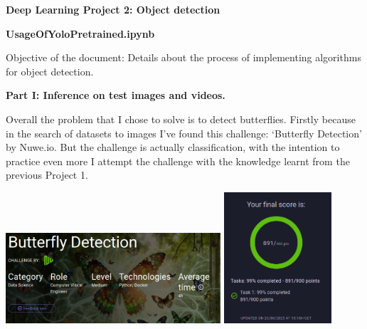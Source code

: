 \documentclass{cpsc202}
\begin{document}
    \centerline{\Large\textbf{Deep Learning Project 2: Object detection}}
    \Large\textbf{UsageOfYoloPretrained.ipynb}

    Objective of the document: Details about the process of implementing algorithms for object detection.

    \large\textbf{Part I: Inference on test images and videos.}

    Overall the problem that I chose to solve is to detect butterflies.
    Firstly because in the search of datasets to images I've found this challenge: `Butterfly Detection' by Nuwe.io.
    But the challenge is actually classification, with the intention to practice even more I attempt the challenge with the knowledge learnt from the previous Project 1.
    \begin{center}
        \includegraphics[width=0.6\textwidth]{challenge_butterfly_classification}
        \includegraphics[width=0.3\textwidth]{challenge_result}
    \end{center}
\end{document}
